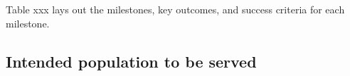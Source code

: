 \documentclass[11pt]{article}
\begin{document}

Table xxx lays out the milestones, key outcomes, and success criteria for each milestone. 

\subsection{Intended population to be served}
\end{document}
